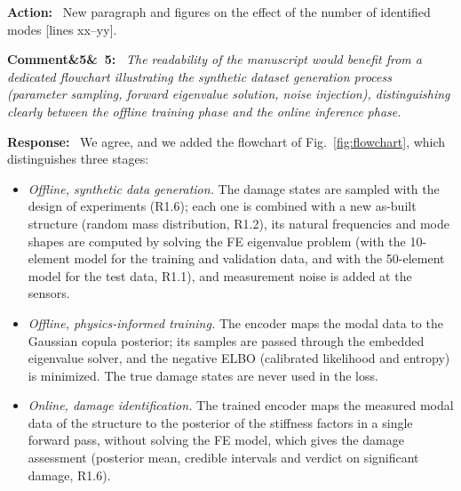 \documentclass[11pt]{article}
\newenvironment{rcomment}[1]{\par\bigskip\noindent\textbf{Comment\ifx&#1&\else\ #1\fi:}\ \itshape}{\par}
\newenvironment{response}{\par\smallskip\noindent\color{resp}\textbf{Response:}\ }{\par}
\newenvironment{action}{\par\smallskip\noindent\color{resp}\textbf{Action:}\ }{\par}
\newcommand{\tbd}[1]{\textcolor{note}{\textsf{[#1]}}}
\newcommand{\lines}[1]{\tbd{lines #1}}
\begin{document}
\begin{action}
New paragraph and figures on the effect of the number of identified modes \lines{xx--yy}.
\end{action}

\begin{rcomment}{5}
The readability of the manuscript would benefit from a dedicated flowchart illustrating the synthetic dataset
generation process (parameter sampling, forward eigenvalue solution, noise injection), distinguishing clearly between
the offline training phase and the online inference phase.
\end{rcomment}

\begin{response}
We agree, and we added the flowchart of Fig.~\ref{fig:flowchart}, which distinguishes three stages:
\begin{itemize}[leftmargin=*]
\item \emph{Offline, synthetic data generation.} The damage states are sampled with the design of experiments (R1.6);
each one is combined with a new as-built structure (random mass distribution, R1.2), its natural frequencies and mode
shapes are computed by solving the FE eigenvalue problem (with the 10-element model for the training and
validation data, and with the 50-element model for the test data, R1.1), and measurement noise is added at the sensors.
\item \emph{Offline, physics-informed training.} The encoder maps the modal data to the Gaussian copula posterior; its
samples are passed through the embedded eigenvalue solver, and the negative ELBO (calibrated likelihood and entropy) is
minimized. The true damage states are never used in the loss.
\item \emph{Online, damage identification.} The trained encoder maps the measured modal data of the structure to the
posterior of the stiffness factors in a single forward pass, without solving the FE model, which gives the damage
assessment (posterior mean, credible intervals and verdict on significant damage, R1.6).
\end{itemize}
\end{response}
\end{document}
